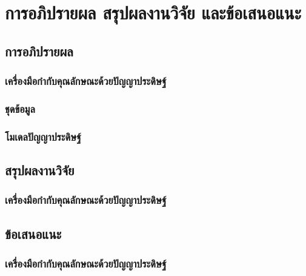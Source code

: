 
\chapter{การอภิปรายผล สรุปผลงานวิจัย และข้อเสนอแนะ}

\section{การอภิปรายผล}
\subsection{เครื่องมือกำกับคุณลักษณะด้วยปัญญาประดิษฐ์}


\subsection{ชุดข้อมูล}

\subsection{โมเดลปัญญาประดิษฐ์}


\section{สรุปผลงานวิจัย}
\subsection{เครื่องมือกำกับคุณลักษณะด้วยปัญญาประดิษฐ์}


\section{ข้อเสนอแนะ}
\subsection{เครื่องมือกำกับคุณลักษณะด้วยปัญญาประดิษฐ์}

